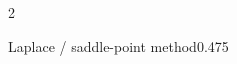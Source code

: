 \documentclass[8pt,a4paper]{extarticle}
\newcommand{\dd}{\,\mathrm d}
\newcommand{\e}{\mathrm e}
\begin{document}
\begin{multicols*}{2}
\begin{mytikzbox}{Laplace / saddle-point method}{0.475}

\end{mytikzbox}


\end{multicols*}
\end{document}

